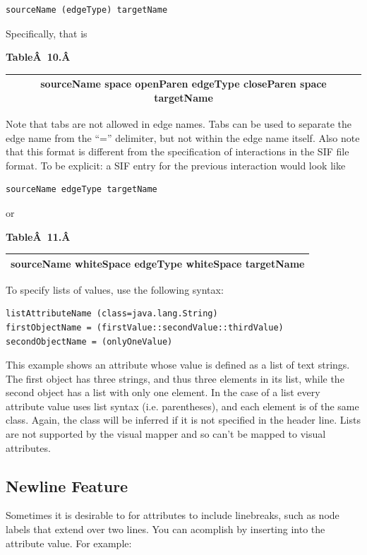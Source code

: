  \begin{verbatim}
sourceName (edgeType) targetName
\end{verbatim}

 Specifically, that is 

 \textbf{Table\^A 10.\^A }

\begin{tabular}{|c|}
 \hline 
 sourceName space openParen edgeType closeParen space targetName \\
 \hline 
\end{tabular}

 Note that tabs are not allowed in edge names. Tabs can be used to separate the
edge name from the ``='' delimiter, but not within the edge name itself. Also
note that this format is different from the specification of interactions in
the SIF file format. To be explicit: a SIF entry for the previous interaction
would look like 

 \begin{verbatim}
sourceName edgeType targetName
\end{verbatim}

 or 

 \textbf{Table\^A 11.\^A }
\begin{tabular}{|c|}
\hline 
 sourceName whiteSpace edgeType whiteSpace targetName \\
\hline 
\end{tabular}

 To specify lists of values, use the following syntax: 

 \begin{verbatim}
listAttributeName (class=java.lang.String)
firstObjectName = (firstValue::secondValue::thirdValue)
secondObjectName = (onlyOneValue)
\end{verbatim}

 This example shows an attribute whose value is defined as a list of text
strings. The first object has three strings, and thus three elements in its
list, while the second object has a list with only one element. In the case of
a list every attribute value uses list syntax (i.e. parentheses), and each
element is of the same class. Again, the class will be inferred if it is not
specified in the header line. Lists are not supported by the visual mapper and
so can't be mapped to visual attributes. 

\subsection{Newline Feature}
Sometimes it is desirable to for attributes to include linebreaks, such as node
labels that extend over two lines. You can acomplish by inserting   into the
attribute value. For example: 

